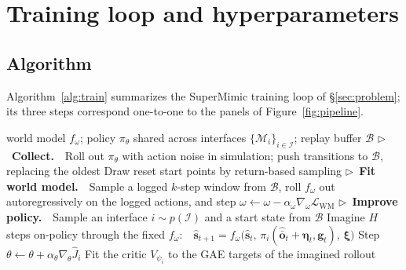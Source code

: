\section{Training loop and hyperparameters}
\label{app:algorithm}

\subsection{Algorithm}

Algorithm~\ref{alg:train} summarizes the SuperMimic training loop of \S\ref{sec:problem}; its three steps correspond one-to-one to the panels of Figure~\ref{fig:pipeline}.

\begin{algorithm}[t]
\caption{\textbf{SuperMimic training.} Both $\omega$ and $\theta$ update every iteration; $\omega$ is held fixed (stop-gradient) only inside the policy's backward pass. For a downstream interface, $\hat{J}_i$ updates only its encoder $\mathrm{enc}_{\theta,i}$.}
\label{alg:train}
\begin{algorithmic}[1]\small
\Require world model $f_\omega$; policy $\pi_\theta$ shared across interfaces $\{\mathcal{M}_i\}_{i\in\mathcal{I}}$; replay buffer $\mathcal{B}$
    \State \(\triangleright\)~\textbf{Collect.}\ \ Roll out $\pi_\theta$ with action noise in simulation; push transitions to $\mathcal{B}$, replacing the oldest
    \State \quad Draw reset start points by return-based sampling 
    \State \(\triangleright\)~\textbf{Fit world model.}\ \ Sample a logged $k$-step window from $\mathcal{B}$, roll $f_\omega$ out autoregressively on the logged actions, and step $\omega \gets \omega - \alpha_\omega \nabla_\omega \mathcal{L}_{\text{WM}}$ 
    \State \(\triangleright\)~\textbf{Improve policy.}\ \ Sample an interface $i \sim p(\mathcal{I})$ and a start state from $\mathcal{B}$
    \State \quad Imagine $H$ steps on-policy through the fixed $f_\omega$:\ \ $\hat{\bm{s}}_{t+1} = f_\omega\big(\hat{\bm{s}}_t,\, \pi_i(\hat{\bar{\bm{o}}}_t+\bm{\eta}_t, \bm{g}_t),\, \bm{\xi}\big)$
    \State \quad Step $\theta \gets \theta + \alpha_\theta \nabla_\theta \hat{J}_i$ 
    \State \quad Fit the critic $V_{\psi_i}$ to the GAE targets of the imagined rollout 
\EndFor
\end{algorithmic}
\end{algorithm}


